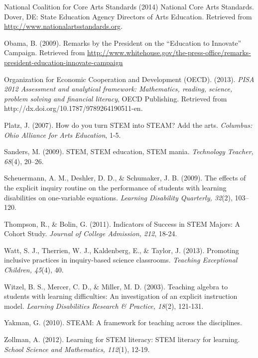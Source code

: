 \documentclass[11.5pt]{sig-alternate} %
\begin{document}
National Coalition for Core Arts Standards (2014) National Core Arts Standards.  Dover, DE:  State Education Agency Directors of Arts Education.  Retrieved from \url{http://www.nationalartsstandards.org}. 

Obama, B. (2009). Remarks by the President on the “Education to Innovate” Campaign. Retrieved from \url{http://www.whitehouse.gov/the-press-office/remarks-president-education-innovate-campaign}

Organization for Economic Cooperation and Development (OECD). (2013). \textit{PISA 2012 Assessment and analytical framework: Mathematics, reading, science, problem solving and financial literacy}, OECD Publishing. Retrieved from http://dx.doi.org/10.1787/9789264190511-en.

Platz, J. (2007). How do you turn STEM into STEAM? Add the arts.\textit{ Columbus: Ohio Alliance for Arts Education}, 1-5.

Sanders, M. (2009). STEM, STEM education, STEM mania. \textit{Technology Teacher, 68}(4), 20–26. 

Scheuermann, A. M., Deshler, D. D., \& Schumaker, J. B. (2009). The effects of the explicit inquiry routine on the performance of students with learning disabilities on one-variable equations. \textit{Learning Disability Quarterly, 32}(2), 103–120.

Thompson, R., \& Bolin, G. (2011). Indicators of Success in STEM Majors: A Cohort Study. \textit{Journal of College Admission, 212}, 18-24.

Watt, S. J., Therrien, W. J., Kaldenberg, E., \& Taylor, J. (2013). Promoting inclusive practices in inquiry-based science classrooms. \textit{Teaching Exceptional Children, 45}(4), 40.

Witzel, B. S., Mercer, C. D., \& Miller, M. D. (2003). Teaching algebra to students with learning difficulties: An investigation of an explicit instruction model. \textit{Learning Disabilities Research \& Practice, 18}(2), 121-131.

Yakman, G. (2010). STEAM: A framework for teaching across the disciplines.

Zollman, A. (2012). Learning for STEM literacy: STEM literacy for learning. \textit{School Science and Mathematics, 112}(1), 12-19.
\end{document}
